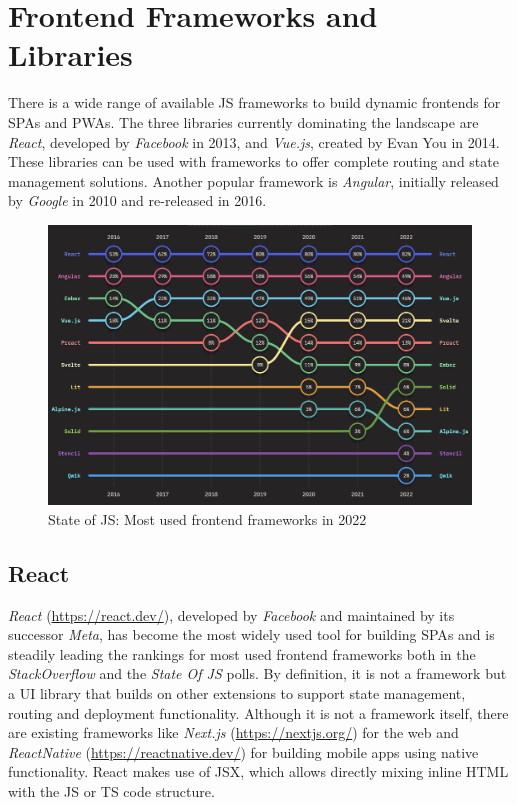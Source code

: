 \section{Frontend Frameworks and Libraries}

There is a wide range of available \ac{JS} frameworks to build dynamic frontends for \ac{SPA}s and \ac{PWA}s. The three libraries currently dominating the landscape are \emph{React}, developed by \emph{Facebook} in 2013, and \emph{Vue.js}, created by Evan You in 2014. These libraries can be used with frameworks to offer complete routing and state management solutions. Another popular framework is \emph{Angular}, initially released by \emph{Google} in 2010 and re-released in 2016.

\begin{figure}[h]
    \centering
    \includegraphics[scale=0.4]{04_Artefakte/01_Abbildungen/stateofjs-usage-frontend-frameworks-2022}
    \caption[{Most used frontend frameworks in 2022}]{State of JS: Most used frontend frameworks in 2022\protect\footnotemark}
    \label{fig:mostUsedFrameworks}
\end{figure}

\subsection{React}

\emph{React} (\url{https://react.dev/}), developed by \emph{Facebook} and maintained by its successor \emph{Meta}, has become the most widely used tool for building \ac{SPA}s and is steadily leading the rankings for most used frontend frameworks both in the \emph{StackOverflow} \parencite{stackOverflowPollWebFrameworks23} and the \emph{State Of JS} \parencite{mostUsedFrontendFrameworks22} polls. By definition, it is not a framework but a \ac{UI} library that builds on other extensions to support state management, routing and deployment functionality. Although it is not a framework itself, there are existing frameworks like \emph{Next.js} (\url{https://nextjs.org/}) for the web and \emph{ReactNative} (\url{https://reactnative.dev/}) for building mobile apps using native functionality. React makes use of \ac{JSX}, which allows directly mixing inline \ac{HTML} with the \ac{JS} or \ac{TS} code structure.

